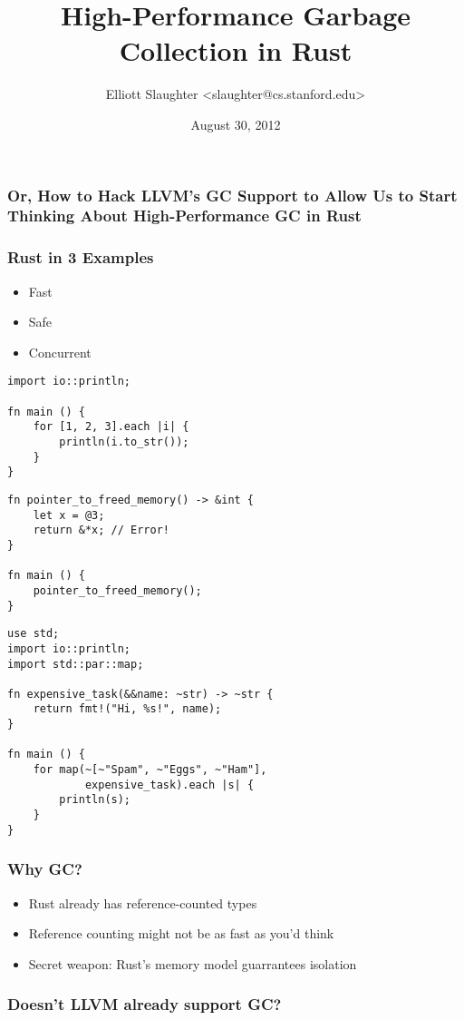 \documentclass[ignorenonframetext,]{beamer}
\title{High-Performance Garbage Collection in Rust}
\author{Elliott Slaughter \textless{}slaughter@cs.stanford.edu\textgreater{}}
\date{August 30, 2012}
\begin{document}
\frame{\titlepage}

\begin{frame}\frametitle{Or, How to Hack LLVM's GC Support to Allow Us
to Start Thinking About High-Performance GC in Rust}

\end{frame}

\begin{frame}[fragile]\frametitle{Rust in 3 Examples}

\begin{itemize}
  \item<alert@2> Fast
  \item<alert@3> Safe
  \item<alert@4> Concurrent
\end{itemize}

\begin{lrbox}{\exampleone}
\begin{lstlisting}
import io::println;

fn main () {
    for [1, 2, 3].each |i| {
        println(i.to_str());
    }
}
\end{lstlisting}
\end{lrbox}

\begin{lrbox}{\exampletwo}
\begin{lstlisting}
fn pointer_to_freed_memory() -> &int {
    let x = @3;
    return &*x; // Error!
}

fn main () {
    pointer_to_freed_memory();
}

\end{lstlisting}
\end{lrbox}

\begin{lrbox}{\examplethree}
\begin{lstlisting}
use std;
import io::println;
import std::par::map;

fn expensive_task(&&name: ~str) -> ~str {
    return fmt!("Hi, %s!", name);
}

fn main () {
    for map(~[~"Spam", ~"Eggs", ~"Ham"],
            expensive_task).each |s| {
        println(s);
    }
}
\end{lstlisting}
\end{lrbox}



\end{frame}

\begin{frame}\frametitle{Why GC?}

\begin{itemize}
\item
  Rust already has reference-counted types
\item
  Reference counting might not be as fast as you'd think
\item
  Secret weapon: Rust's memory model guarrantees isolation
\end{itemize}

\end{frame}

\begin{frame}\frametitle{Doesn't LLVM already support GC?}

\end{frame}
\end{document}
